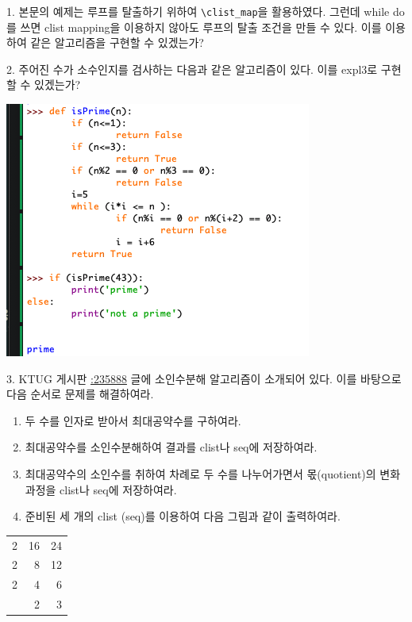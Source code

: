 \documentclass[a4paper,amsmath]{oblivoir}
\makeatletter
\let\ATonum\@onum
\makeatother
\begin{document}
\begin{questionp}

 1. 본문의 예제는 루프를 탈출하기 위하여 \verb|\clist_map|을 활용하였다.
그런데 while do를 쓰면 clist mapping을 이용하지 않아도 루프의 탈출 조건을 
만들 수 있다. 이를 이용하여 같은 알고리즘을 구현할 수 있겠는가?

\bigskip

 2. 주어진 수가 소수인지를 검사하는 다음과 같은 알고리즘이 있다. 이를 expl3로 구현할 수 있겠는가?

\medskip

\includegraphics[scale=.78]{Screenshot-2}


\bigskip

 3. KTUG 게시판 \href{http://www.ktug.org/xe/index.php?document_srl=235888&mid=KTUG_open_board}{:235888} 글에 소인수분해 알고리즘이 소개되어 있다. 
이를 바탕으로 다음 순서로 문제를 해결하여라.
\begin{enumerate}[\ \ \expandafter\ATonum1] \firmlist
\item 두 수를 인자로 받아서 최대공약수를 구하여라.
\item 최대공약수를 소인수분해하여 결과를 clist나 seq에 저장하여라.
\item 최대공약수의 소인수를 취하여 차례로 두 수를 나누어가면서 몫(quotient)의 변화 과정을 clist나 seq에 저장하여라.
\item 준비된 세 개의 clist (seq)를 이용하여 다음 그림과 같이 출력하여라.
\end{enumerate}
\begin{center}
\begin{tabular}{r|rr}
2 & 16 & 24 \\ \cline{2-3}
2 & 8  & 12 \\ \cline{2-3}
2 & 4 & 6 \\ \cline{2-3}
  & 2 & 3 \\ 
\end{tabular}
\end{center}


\end{questionp}
\end{document}
